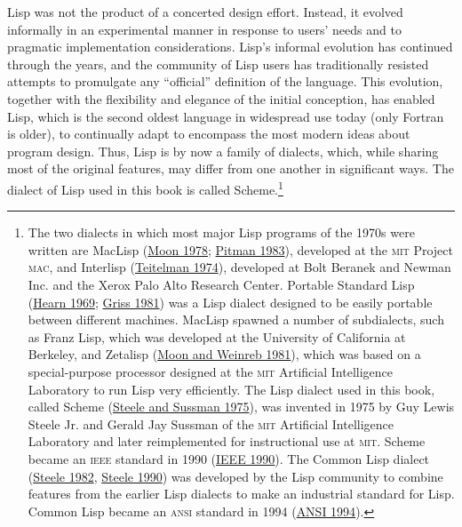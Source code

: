 \documentclass[oneside]{book}
\newcommand{\acronym}[1]{\textsc{\MakeLowercase{#1}}}
\newcommand{\link}[1]{\hyperref[#1]{#1}}
\begin{document}
Lisp was not the product of a concerted design effort.  Instead, it evolved
informally in an experimental manner in response to users' needs and to
pragmatic implementation considerations.  Lisp's informal evolution has
continued through the years, and the community of Lisp users has traditionally
resisted attempts to promulgate any ``official'' definition of the language.
This evolution, together with the flexibility and elegance of the initial
conception, has enabled Lisp, which is the second oldest language in widespread
use today (only Fortran is older), to continually adapt to encompass the most
modern ideas about program design.  Thus, Lisp is by now a family of dialects,
which, while sharing most of the original features, may differ from one another
in significant ways.  The dialect of Lisp used in this book is called
Scheme.\footnote{The two dialects in which most major Lisp programs of the
1970s were written are MacLisp (\link{Moon 1978}; \link{Pitman 1983}), developed at the
\acronym{MIT} Project \acronym{MAC}, and Interlisp (\link{Teitelman 1974}), developed
at Bolt Beranek and Newman Inc. and the Xerox Palo Alto Research Center.
Portable Standard Lisp (\link{Hearn 1969}; \link{Griss 1981}) was a Lisp dialect designed to
be easily portable between different machines.  MacLisp spawned a number of
subdialects, such as Franz Lisp, which was developed at the University of
California at Berkeley, and Zetalisp (\link{Moon and Weinreb 1981}), which was based on a
special-purpose processor designed at the \acronym{MIT} Artificial Intelligence
Laboratory to run Lisp very efficiently.  The Lisp dialect used in this book,
called Scheme (\link{Steele and Sussman 1975}), was invented in 1975 by Guy Lewis Steele Jr. and
Gerald Jay Sussman of the \acronym{MIT} Artificial Intelligence Laboratory and
later reimplemented for instructional use at \acronym{MIT}.  Scheme became an
\acronym{IEEE} standard in 1990 (\link{IEEE 1990}).  The Common Lisp dialect
(\link{Steele 1982}, \link{Steele 1990}) was developed by the Lisp community to combine
features from the earlier Lisp dialects to make an industrial standard for
Lisp.  Common Lisp became an \acronym{ANSI} standard in 1994 (\link{ANSI 1994}).}
\end{document}
